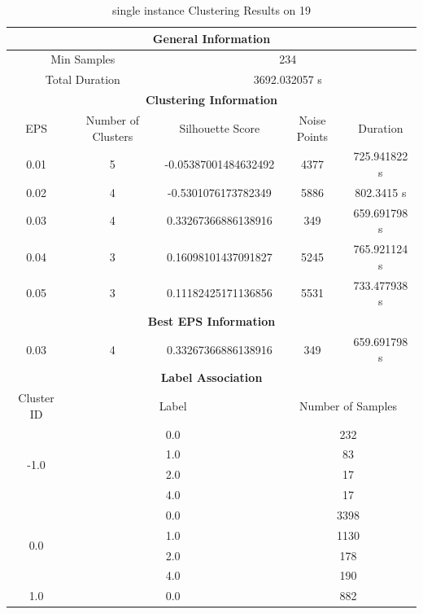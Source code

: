 \begin{longtable}{|c|c|c|c|c|}
\caption{single instance Clustering Results on 19} \label{tab:19_single_instance_clustering_results}\\
\hline
\multicolumn{5}{|c|}{\textbf{General Information}} \\
\hline
\multicolumn{2}{|c|}{Min Samples} & \multicolumn{3}{c|}{234} \\
\multicolumn{2}{|c|}{Total Duration} & \multicolumn{3}{c|}{3692.032057 s} \\
\hline
\multicolumn{5}{|c|}{\textbf{Clustering Information}} \\
\hline
EPS & Number of Clusters & Silhouette Score & Noise Points & Duration \\
0.01 & 5 & -0.05387001484632492 & 4377 & 725.941822 s\\
0.02 & 4 & -0.5301076173782349 & 5886 & 802.3415 s\\
0.03 & 4 & 0.33267366886138916 & 349 & 659.691798 s\\
0.04 & 3 & 0.16098101437091827 & 5245 & 765.921124 s\\
0.05 & 3 & 0.11182425171136856 & 5531 & 733.477938 s\\
\hline
\multicolumn{5}{|c|}{\textbf{Best EPS Information}} \\
\hline
0.03 & 4 & 0.33267366886138916 & 349 & 659.691798 s\\
\hline
\multicolumn{5}{|c|}{\textbf{Label Association}} \\
\hline
Cluster ID & \multicolumn{2}{c|}{Label} & \multicolumn{2}{c|}{Number of Samples} \\
\hline
\multirow{4}{*}{-1.0} & \multicolumn{2}{c|}{0.0} & \multicolumn{2}{c|}{232} \\
& \multicolumn{2}{c|}{1.0} & \multicolumn{2}{c|}{83} \\
& \multicolumn{2}{c|}{2.0} & \multicolumn{2}{c|}{17} \\
& \multicolumn{2}{c|}{4.0} & \multicolumn{2}{c|}{17} \\
\hline
\multirow{4}{*}{0.0} & \multicolumn{2}{c|}{0.0} & \multicolumn{2}{c|}{3398} \\
& \multicolumn{2}{c|}{1.0} & \multicolumn{2}{c|}{1130} \\
& \multicolumn{2}{c|}{2.0} & \multicolumn{2}{c|}{178} \\
& \multicolumn{2}{c|}{4.0} & \multicolumn{2}{c|}{190} \\
\hline
\multirow{4}{*}{1.0} & \multicolumn{2}{c|}{0.0} & \multicolumn{2}{c|}{882} \\

\end{longtable}
